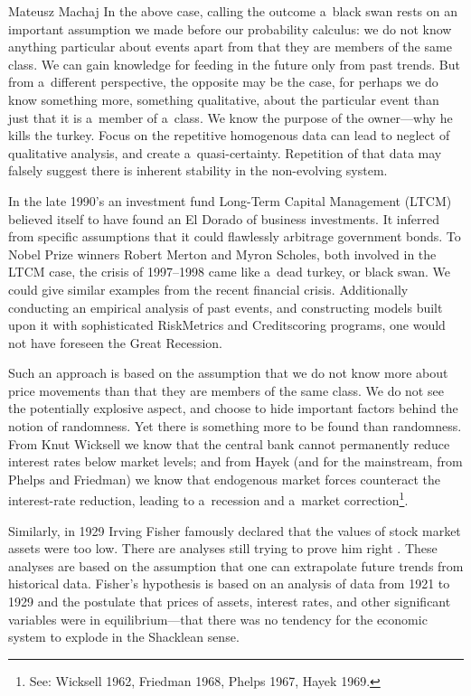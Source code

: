 \begin{artengenv}{Mateusz Machaj}
In the above case, calling the outcome a~black swan rests on an important assumption we made before our probability calculus: we do not know anything particular about events apart from that they are members of the same class. We can gain knowledge for feeding in the future only from past trends. But from a~different perspective, the opposite may be the case, for perhaps we do know something more, something qualitative, about the particular event than just that it is a~member of a~class. We know the purpose of the owner---why he kills the turkey. Focus on the repetitive homogenous data can lead to neglect of qualitative analysis, and create a~quasi-certainty. Repetition of that data may falsely suggest there is inherent stability in the non-evolving system.



In the late 1990's an investment fund Long-Term Capital Management (LTCM) believed itself to have found an El Dorado of business investments. It inferred from specific assumptions that it could flawlessly arbitrage government bonds. To Nobel Prize winners Robert Merton and Myron Scholes, both involved in the LTCM case, the crisis of 1997–1998 came like a~dead turkey, or black swan. We could give similar examples from the recent financial crisis. Additionally conducting an empirical analysis of past events, and constructing models built upon it with sophisticated RiskMetrics and Creditscoring programs, one would not have foreseen the Great Recession.



Such an approach is based on the assumption that we do not know more about price movements than that they are members of the same class. We do not see the potentially explosive aspect, and choose to hide important factors behind the notion of randomness. Yet there is something more to be found than randomness. From Knut Wicksell we know that the central bank cannot permanently reduce interest rates below market levels; and from Hayek (and for the mainstream, from Phelps and Friedman) we know that endogenous market forces counteract the interest-rate reduction, leading to a~recession and a~market correction\footnote{See: Wicksell 1962, Friedman 1968, Phelps 1967, Hayek 1969.}.



Similarly, in 1929 Irving Fisher famously declared that the values of stock market assets were too low. There are analyses still trying to prove him right 
\parencite[see, for example,][]{mcgrattan_1929_2003}. %
 These analyses are based on the assumption that one can extrapolate future trends from historical data. Fisher's hypothesis is based on an analysis of data from 1921 to 1929 and the postulate that prices of assets, interest rates, and other significant variables were in equilibrium---that there was no tendency for the economic system to explode in the Shacklean sense.




\end{artengenv}

